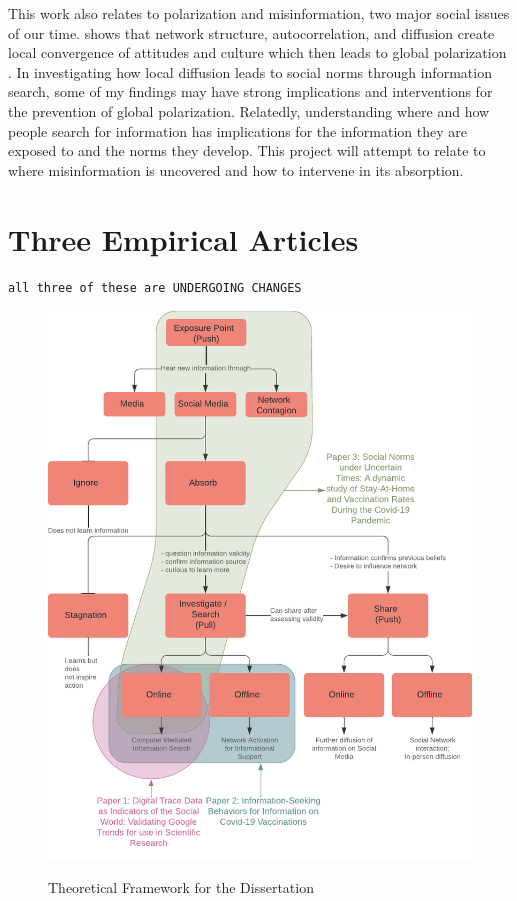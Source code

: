 This work also relates to polarization and misinformation, two major
social issues of our time. \citet{axelrodDisseminationCultureModel1997} shows that network structure,
autocorrelation, and diffusion create local convergence of attitudes and
culture which then leads to global polarization \citep{dellapostaWhyLiberalsDrink2015}. In investigating how local diffusion leads to social norms
through information search, some of my findings may have strong
implications and interventions for the prevention of global
polarization. Relatedly, understanding where and how people search for
information has implications for the information they are exposed to and
the norms they develop. This project will attempt to relate to where
misinformation is uncovered and how to intervene in its absorption.

\section{Three Empirical Articles}

\begin{center}
    \texttt{all three of these are UNDERGOING CHANGES}
\end{center}


\begin{figure}
{\centering \includegraphics[width=\linewidth]{figs/ch1/Dissertation Concept Map - Color.pdf}}
\caption{Theoretical Framework for the Dissertation}\label{fig:concept-map}
\end{figure}

